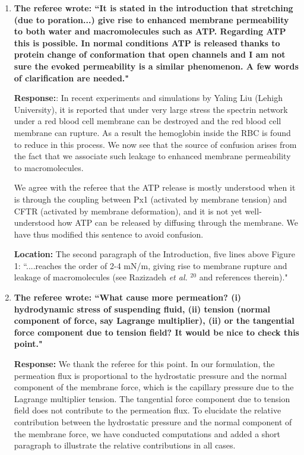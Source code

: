 \documentclass[12pt]{article}
\begin{document}
\begin{enumerate}
\item {\bf 
The referee wrote:
``It is stated in the introduction that stretching (due to
    poration...) give rise to enhanced membrane permeability to
    both water and macromolecules such as ATP. Regarding ATP this is
    possible. In normal conditions ATP is released thanks to protein
    change of conformation that open channels and I am not sure the
    evoked permeability is a similar phenomenon. A few words of
    clarification are needed."}

\noindent
{\bf Response:}: In recent experiments and simulations by Yaling Liu (Lehigh University), it is reported that under very large stress the spectrin network under a red blood cell membrane can be destroyed and the red blood cell membrane can rupture. As a result the hemoglobin inside the RBC is found to reduce in this process. We now see that the source of confusion arises from the fact that we associate such leakage to enhanced membrane permeability to macromolecules. 

We agree with the referee that the ATP release is mostly understood when
    it is through the coupling between Px1 (activated by membrane
    tension) and CFTR (activated by membrane deformation), and it is not
    yet well-understood how ATP can be released by diffusing through the
    membrane. We have thus modified this sentence to avoid confusion.

\noindent
{\bf Location:}  The second paragraph of the Introduction, five lines
    above Figure 1: ``....reaches the order of 2-4 mN/m, giving rise to
    membrane rupture and leakage of macromolecules (see Razizadeh {\it
    et al. }$^{20}$ and references therein)."

\item {\bf
The referee wrote:
``What cause more permeation? (i) hydrodynamic stress of suspending
fluid, (ii) tension (normal component of force, say Lagrange
multiplier), (ii) or the tangential force component due to tension
field? It would be nice to check this point."}

\noindent
{\bf Response:} We thank the referee for this point. In our
    formulation, the permeation flux is proportional to the hydrostatic
    pressure and the normal component of the membrane force, which is
    the capillary pressure due to the Lagrange multiplier tension. The
    tangential force component due to tension field does not contribute
    to the permeation flux. To elucidate the relative contribution
    between the hydrostatic pressure and the normal component of the
    membrane force, we have conducted computations and added a short
    paragraph to illustrate the relative contributions in all cases.


\end{enumerate}
\end{document}
